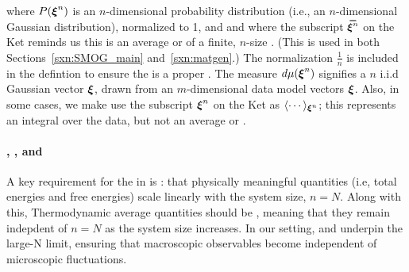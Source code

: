 where $P(\boldsymbol{\xi}^{n})$ is an $n$-dimensional
probability distribution (i.e., an $n$-dimensional Gaussian distribution), normalized to 1, and
and where the subscript $\AVGNDXIn$ on the Ket reminds us this is an average or \ExpectedValue of a finite, $n$-size \ModelSample.
(This is used in both Sections~\ref{sxn:SMOG_main} and~\ref{sxn:matgen}.)
The normalization $\tfrac{1}{n}$ is included in the defintion to ensure the \BraKet is a proper \ExpectedValue.
The measure $d\mu(\boldsymbol{\xi}^{n})$ signifies a $n$ i.i.d Gaussian vector $\boldsymbol{\xi}$, drawn from an $m$-dimensional data model vectors $\boldsymbol{\xi}$.
Also, in some cases, we make use the subscript $\boldsymbol{\xi}^{n}$ on the Ket as $\langle\cdots\rangle_{\boldsymbol{\xi}^{n}}$;  this represents an integral over the data, but not an average or \ExpectedValue.
%

\paragraph{\SizeExtensivity, \SizeIntensivity, and \SizeConsistency}
A key requirement for the \ThermodynamicLimit in \STATMECH is \emph{\SizeExtensivity}:
that physically meaningful quantities (i.e, total energies and free energies)
scale linearly with the system size, $n=N$.
Along with this, Thermodynamic average quantities should be \emph{\SizeIntensive},
meaning that they remain indepdent of $n=N$ as the system size increases.
In our setting, \SizeExtensivity and \SizeIntensivity underpin the large-N limit,
ensuring that macroscopic observables become independent of
microscopic fluctuations.


